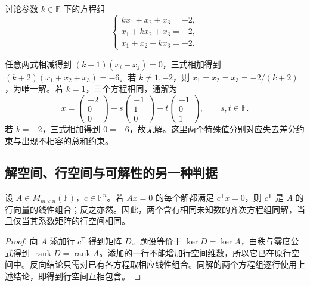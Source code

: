 \begin{example}
\label{ex:laex-parameter-symmetric-system}
讨论参数 $k\in\mathbb F$ 下的方程组
\[
\begin{cases}
kx_1+x_2+x_3=-2,\\
x_1+kx_2+x_3=-2,\\
x_1+x_2+kx_3=-2.
\end{cases}
\]
\end{example}

\begin{solve}
任意两式相减得到 $(k-1)(x_i-x_j)=0$，三式相加得到 $(k+2)(x_1+x_2+x_3)=-6$。若 $k\ne1,-2$，则 $x_1=x_2=x_3=-2/(k+2)$，为唯一解。若 $k=1$，三个方程相同，通解为
\[
x=\begin{pmatrix}-2\\0\\0\end{pmatrix}
+s\begin{pmatrix}-1\\1\\0\end{pmatrix}
+t\begin{pmatrix}-1\\0\\1\end{pmatrix},\qquad s,t\in\mathbb F.
\]
若 $k=-2$，三式相加得到 $0=-6$，故无解。这里两个特殊值分别对应失去差分约束与出现不相容的总和约束。
\end{solve}

\subsection{解空间、行空间与可解性的另一种判据}

\begin{proposition}
\label{prop:laex-kernel-rowspace}
设 $A\in M_{m\times n}(\mathbb F)$，$c\in\mathbb F^n$。若 $Ax=0$ 的每个解都满足 $c^{\mathsf T}x=0$，则 $c^{\mathsf T}$ 是 $A$ 的行向量的线性组合；反之亦然。因此，两个含有相同未知数的齐次方程组同解，当且仅当其系数矩阵的行空间相同。
\end{proposition}

\begin{proof}
向 $A$ 添加行 $c^{\mathsf T}$ 得到矩阵 $D$。题设等价于 $\ker D=\ker A$，由秩与零度公式得到 $\operatorname{rank}D=\operatorname{rank}A$。添加的一行不能增加行空间维数，所以它已在原行空间中。反向结论只需对已有各方程取相应线性组合。同解的两个方程组逐行使用上述结论，即得到行空间互相包含。
\end{proof}

